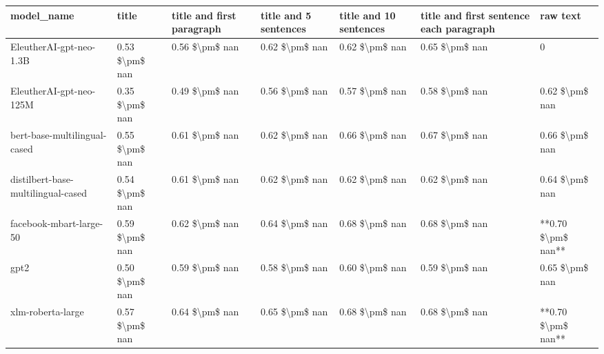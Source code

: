 \begin{tabular}{lllllll}
\toprule
                        model\_name &          title & title and first paragraph & title and 5 sentences & title and 10 sentences & title and first sentence each paragraph &           raw text \\
\midrule
           EleutherAI-gpt-neo-1.3B & 0.53 \$\textbackslash pm\$ nan &            0.56 \$\textbackslash pm\$ nan &        0.62 \$\textbackslash pm\$ nan &         0.62 \$\textbackslash pm\$ nan &                          0.65 \$\textbackslash pm\$ nan &                  0 \\
           EleutherAI-gpt-neo-125M & 0.35 \$\textbackslash pm\$ nan &            0.49 \$\textbackslash pm\$ nan &        0.56 \$\textbackslash pm\$ nan &         0.57 \$\textbackslash pm\$ nan &                          0.58 \$\textbackslash pm\$ nan &     0.62 \$\textbackslash pm\$ nan \\
      bert-base-multilingual-cased & 0.55 \$\textbackslash pm\$ nan &            0.61 \$\textbackslash pm\$ nan &        0.62 \$\textbackslash pm\$ nan &         0.66 \$\textbackslash pm\$ nan &                          0.67 \$\textbackslash pm\$ nan &     0.66 \$\textbackslash pm\$ nan \\
distilbert-base-multilingual-cased & 0.54 \$\textbackslash pm\$ nan &            0.61 \$\textbackslash pm\$ nan &        0.62 \$\textbackslash pm\$ nan &         0.62 \$\textbackslash pm\$ nan &                          0.62 \$\textbackslash pm\$ nan &     0.64 \$\textbackslash pm\$ nan \\
           facebook-mbart-large-50 & 0.59 \$\textbackslash pm\$ nan &            0.62 \$\textbackslash pm\$ nan &        0.64 \$\textbackslash pm\$ nan &         0.68 \$\textbackslash pm\$ nan &                          0.68 \$\textbackslash pm\$ nan & **0.70 \$\textbackslash pm\$ nan** \\
                              gpt2 & 0.50 \$\textbackslash pm\$ nan &            0.59 \$\textbackslash pm\$ nan &        0.58 \$\textbackslash pm\$ nan &         0.60 \$\textbackslash pm\$ nan &                          0.59 \$\textbackslash pm\$ nan &     0.65 \$\textbackslash pm\$ nan \\
                 xlm-roberta-large & 0.57 \$\textbackslash pm\$ nan &            0.64 \$\textbackslash pm\$ nan &        0.65 \$\textbackslash pm\$ nan &         0.68 \$\textbackslash pm\$ nan &                          0.68 \$\textbackslash pm\$ nan & **0.70 \$\textbackslash pm\$ nan** \\
\bottomrule
\end{tabular}

